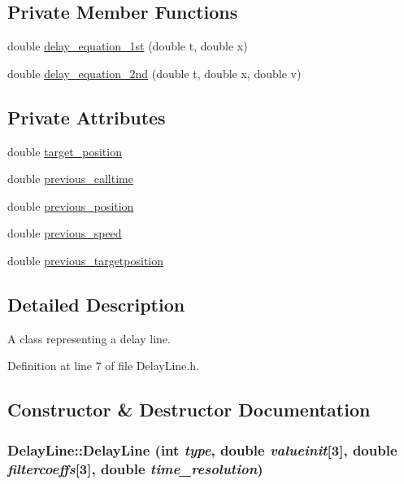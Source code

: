 \subsection*{Private Member Functions}
\begin{DoxyCompactItemize}
\item 
double \hyperlink{classDelayLine_a138684e1f275e87508a1f71c6599f6f9}{delay\_\-equation\_\-1st} (double t, double x)
\item 
double \hyperlink{classDelayLine_a49bab775499a10b2cae182b7706275bc}{delay\_\-equation\_\-2nd} (double t, double x, double v)
\end{DoxyCompactItemize}
\subsection*{Private Attributes}
\begin{DoxyCompactItemize}
\item 
double \hyperlink{classDelayLine_a27fb66446caf539997819c3600e5299e}{target\_\-position}
\item 
double \hyperlink{classDelayLine_a76e51812021b57490411c932f607d82b}{previous\_\-calltime}
\item 
double \hyperlink{classDelayLine_a38f0fbf9f3090542153f5d6428edb20b}{previous\_\-position}
\item 
double \hyperlink{classDelayLine_a0e814cb4b3e6fdfbbbf6157f02a938df}{previous\_\-speed}
\item 
double \hyperlink{classDelayLine_a1565f8501d8baba454f5d7743b90bf97}{previous\_\-targetposition}
\end{DoxyCompactItemize}


\subsection{Detailed Description}
A class representing a delay line. 

Definition at line 7 of file DelayLine.h.



\subsection{Constructor \& Destructor Documentation}
\hypertarget{classDelayLine_aae3ff3e21f8887d0df1948e13c093b90}{
\subsubsection[{DelayLine}]{\setlength{\rightskip}{0pt plus 5cm}DelayLine::DelayLine (int {\em type}, \/  double {\em valueinit}\mbox{[}3\mbox{]}, \/  double {\em filtercoeffs}\mbox{[}3\mbox{]}, \/  double {\em time\_\-resolution})}}
\label{classDelayLine_aae3ff3e21f8887d0df1948e13c093b90}


